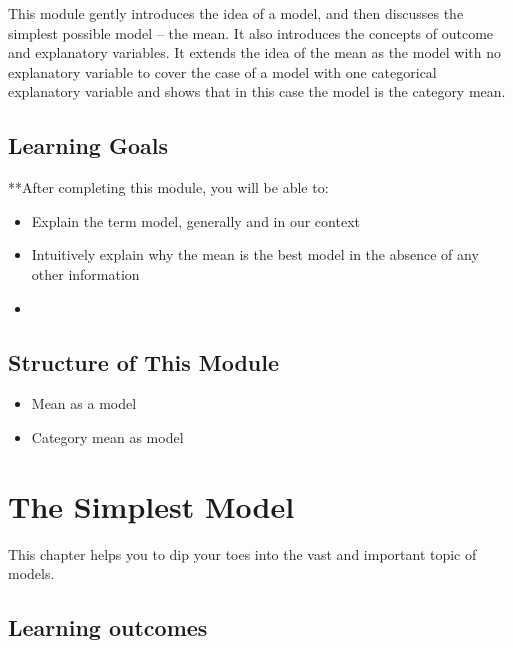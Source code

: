 \documentclass[
  12pt,
  letterpaper,
  DIV=11,
  numbers=noendperiod]{scrreprt}
\providecommand{\tightlist}{%
  \setlength{\itemsep}{0pt}\setlength{\parskip}{0pt}}
\begin{document}

This module gently introduces the idea of a model, and then discusses
the simplest possible model -- the mean. It also introduces the concepts
of outcome and explanatory variables. It extends the idea of the mean as
the model with no explanatory variable to cover the case of a model with
one categorical explanatory variable and shows that in this case the
model is the category mean.

\section*{Learning Goals}\label{learning-goals-2}


**After completing this module, you will be able to:

\begin{itemize}
\item
  Explain the term model, generally and in our context
\item
  Intuitively explain why the mean is the best model in the absence of
  any other information
\item
\end{itemize}

\section*{Structure of This Module}\label{structure-of-this-module-2}


\begin{itemize}
\tightlist
\item
  Mean as a model
\item
  Category mean as model
\end{itemize}

\chapter{The Simplest Model}\label{sec-mean-model}

This chapter helps you to dip your toes into the vast and important
topic of models.

\section*{Learning outcomes}\label{learning-outcomes-4}
\end{document}
